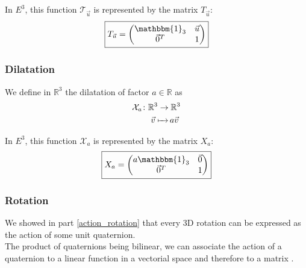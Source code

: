 \documentclass[class=report, float=false, crop=false]{standalone}
\begin{document}
In $E^3$, this function $\mathcal{T}_{\vec{u}}$ is represented by the matrix $T_{\vec{u}}$:
\begin{equation}
\boxed{T_{\vec{u}} = \begin{pmatrix} \mathbbm{1}_3 & \vec{u} \\ \vec{0}^T & 1 \end{pmatrix}}
\label{translation_matrix}
\end{equation}

\subsubsection{Dilatation}

We define in $\mathbb{R}^3$ the dilatation of factor $a \in \mathbb{R}$ as
\begin{align*}
\mathcal{X}_{a} \colon &\mathbb{R}^3 \to \mathbb{R}^3\\     &\phantomarrow{\mathbb{R}^3}{\vec{v}} a\vec{v}
\end{align*}

In $E^3$, this function $\mathcal{X}_{a}$ is represented by the matrix $X_{a}$:
\begin{equation}
\boxed{X_{a} = \begin{pmatrix} a\mathbbm{1}_3 & \vec{0} \\ \vec{0}^T & 1 \end{pmatrix}}
\label{dilatation_matrix}
\end{equation}

\subsubsection{Rotation}

We showed in part \ref{action_rotation} that every 3D rotation can be expressed as the action of some unit quaternion.\\

The product of quaternions being bilinear, we can associate the action of a quaternion to a linear function in a vectorial space and therefore to a matrix \cite{shoemake}.\\
\end{document}
